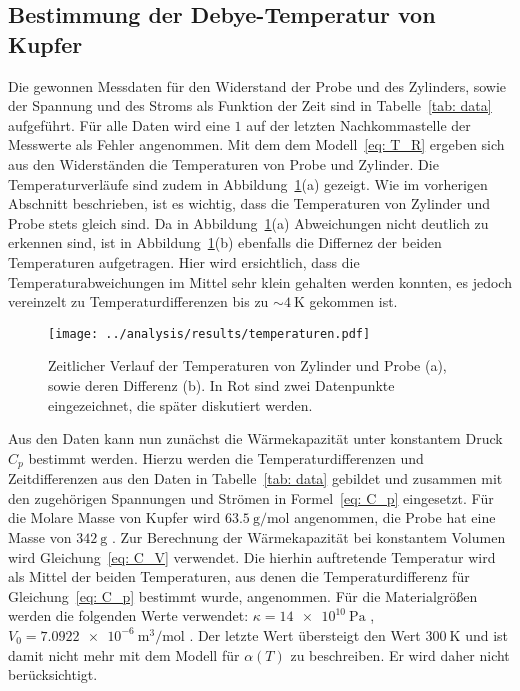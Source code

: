 \subsection{Bestimmung der Debye-Temperatur von Kupfer}
Die gewonnen Messdaten für den Widerstand der Probe und des Zylinders, sowie der Spannung und des Stroms
als Funktion der Zeit sind in Tabelle~\ref{tab: data} aufgeführt. Für alle Daten wird eine $1$ auf der letzten
Nachkommastelle der Messwerte als Fehler angenommen. 
Mit dem dem Modell~\eqref{eq: T_R} ergeben sich aus den Widerständen die Temperaturen von Probe und Zylinder.
Die Temperaturverläufe sind zudem in Abbildung~\ref{fig: temp}(a) gezeigt. Wie im vorherigen Abschnitt beschrieben, ist es 
wichtig, dass die Temperaturen von Zylinder und Probe stets gleich sind. Da in Abbildung~\ref{fig: temp}(a) Abweichungen nicht 
deutlich zu erkennen sind, ist in Abbildung~\ref{fig: temp}(b) ebenfalls die Differnez der beiden Temperaturen 
aufgetragen. Hier wird ersichtlich, dass die Temperaturabweichungen im Mittel sehr klein gehalten werden konnten, es
jedoch vereinzelt zu Temperaturdifferenzen bis zu $\sim\!\SI{4}{\kelvin}$ gekommen ist.
\begin{figure}
\centering
\texttt{[image: ../analysis/results/temperaturen.pdf]}
\caption{Zeitlicher Verlauf der Temperaturen von Zylinder und Probe (a), sowie deren Differenz (b). In Rot sind 
        zwei Datenpunkte eingezeichnet, die später diskutiert werden.}
\label{fig: temp}
\end{figure}



Aus den Daten kann nun zunächst die Wärmekapazität unter konstantem Druck $C_p$ bestimmt werden. Hierzu werden 
die Temperaturdifferenzen und Zeitdifferenzen aus den Daten in Tabelle~\ref{tab: data} gebildet und zusammen mit den 
zugehörigen Spannungen und Strömen in Formel~\eqref{eq: C_p} eingesetzt. Für die Molare Masse von Kupfer 
wird $\SI{63.5}{\gram / \mol}$ \cite{molarmass} angenommen, die Probe hat eine Masse von $\SI{342}{\gram}$ \cite{anleitungV47}. 
Zur Berechnung der Wärmekapazität
bei konstantem Volumen wird Gleichung~\eqref{eq: C_V} verwendet. Die hierhin auftretende Temperatur wird als Mittel 
der beiden Temperaturen, aus denen die Temperaturdifferenz für Gleichung~\eqref{eq: C_p} bestimmt wurde, angenommen. 
Für die Materialgrößen werden die folgenden Werte verwendet: $\kappa = \SI{14e10}{\pascal}$ \cite{gross}, $V_0 = \SI{7.0922e-6}{\meter^3 / \mol}$ \cite{volume}.
Der letzte Wert übersteigt den Wert $\SI{300}{\kelvin}$ und ist damit nicht mehr mit dem Modell für $\alpha(T)$
zu beschreiben. Er wird daher nicht berücksichtigt.

